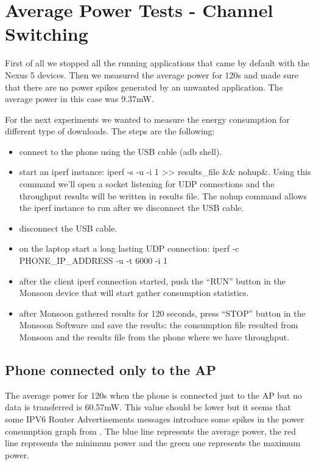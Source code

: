 \newpage
\section{Average Power Tests - Channel Switching}
\label{sec:nexus5-consumption}

First of all we stopped all the running applications that came by default with the Nexus 5 devices. Then we measured the average power for 120s and made sure that there are no power spikes generated by an unwanted application. The average power in this case was 9.37mW.

For the next experiments we wanted to measure the energy consumption for different type of downloads. The steps are the following:
\begin{itemize}
  \item connect to the phone using the USB cable (adb shell).
  \item start an iperf instance: iperf -s -u -i 1 >> results_file \&\& nohup\&. Using this command we'll open a socket listening for UDP connections and the throughput results will be written in results file. The nohup command allows the iperf instance to run after we disconnect the USB cable.
  \item disconnect the USB cable.
  \item on the laptop start a long lasting UDP connection: iperf -c PHONE_IP_ADDRESS -u -t 6000 -i 1
  \item after the client iperf connection started, push the “RUN” button in the Monsoon device that will start gather consumption statistics.
  \item after Monsoon gathered results for 120 seconds, press “STOP” button in the Monsoon Software and save the results: the consumption file resulted from Monsoon and the results file from the phone where we have throughput.
\end{itemize}

\newpage
\subsection{Phone connected only to the AP}
\label{sub-sec:ap-only}
The average power for 120s when the phone is connected just to the AP but no data is transferred is 60.57mW. This value should be lower but it seems that some IPV6 Router Advertisements messages introduce some spikes in the power consumption graph from . The blue line represents the average power, the red line represents the
minimum power and the green one represents the maximum power.

